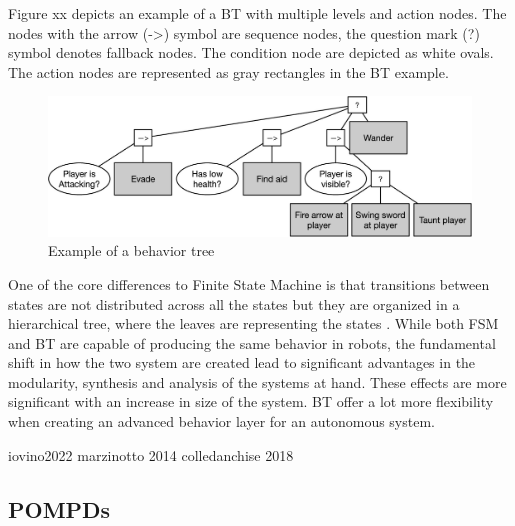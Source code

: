 Figure xx depicts an example of a BT with multiple levels and action nodes. The nodes with the arrow (->) symbol are sequence nodes, the question mark (?) symbol denotes fallback nodes. The condition node are depicted as white ovals. The action nodes are represented as gray rectangles in the BT example.

\begin{figure}[h!]
	\includegraphics[width=1.0\textwidth]{images/bt_example.jpg} 
	\caption{Example of a behavior tree \cite{iovino2022} }
\end{figure}

One of the core differences to Finite State Machine is that transitions between states are not distributed across all the states but they are organized in a hierarchical tree, where the leaves are representing the states \cite{iovino2022}. While both FSM and BT are capable of producing the same behavior in robots, the fundamental shift in how the two system are created lead to significant advantages in the modularity, synthesis and analysis of the systems at hand. These effects are more significant with an increase in size of the system. BT offer a lot more flexibility when creating an advanced behavior layer for an autonomous system. 


iovino2022
marzinotto 2014
colledanchise 2018

\subsection{POMPDs}



